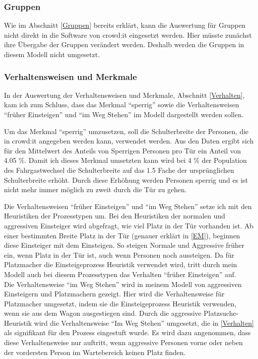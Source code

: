 \subsubsection{Gruppen}
Wie im Abschnitt \ref{Gruppen} bereits erklärt, kann die Auswertung für Gruppen nicht direkt in die Software von crowd:it eingesetzt werden. Hier müsste zunächst ihre Übergabe der Gruppen verändert werden. Deshalb werden die Gruppen in diesem Modell nicht umgesetzt.
\subsubsection{Verhaltensweisen und Merkmale}
In der Auswertung der Verhaltensweisen und Merkmale, Abschnitt \ref{Verhalten}, kam ich zum Schluss, dass das Merkmal "`sperrig"' sowie die Verhaltensweisen "`früher Einsteigen"' und "`im Weg Stehen"' im Modell dargestellt werden sollen. 

Um das Merkmal "`sperrig"' umzusetzen, soll die Schulterbreite der Personen, die in crowd:it angegeben werden kann, verwendet werden. Aus den Daten ergibt sich für den Mittelwert des Anteils von Sperrigen Personen pro Tür ein Anteil von 4.05 \%. Damit ich dieses Merkmal umsetzten kann wird bei 4 \% der Population des Fahrgastwechsel die Schulterbreite auf das 1.5 Fache der ursprünglichen Schulterbreite erhöht. Durch diese Erhöhung werden Personen sperrig und es ist nicht mehr immer möglich zu zweit durch die Tür zu gehen.

Die Verhaltensweisen "`früher Einsteigen"' und "`im Weg Stehen"' setze ich mit den Heuristiken der Prozesstypen um. Bei den Heuristiken der normalen und aggressiven Einsteiger wird abgefragt, wie viel Platz in der Tür vorhanden ist. Ab einer bestimmten Breite Platz in der Tür (genauer erklärt in \ref{EM}), beginnen diese Einsteiger mit dem Einsteigen. So steigen Normale und Aggressive früher ein, wenn Platz in der Tür ist, auch wenn Personen noch aussteigen. Da für Platzmacher die Einsteigeprozess Heuristik verwendet wird, tritt durch mein Modell auch bei diesem Prozesstypen das Verhalten "`früher Einsteigen"' auf.\\
Die Verhaltensweise "`im Weg Stehen"' wird in meinem Modell von aggressiven Einsteigern und Platzmachern gezeigt. Hier wird die Verhaltensweise für Platzmacher umgesetzt, indem sie die Einsteigeprozess Heuristik verwenden, wenn sie aus dem Wagon ausgestiegen sind. Durch die aggressive Platzsuche-Heuristik wird die Verhaltensweise "`Im Weg Stehen"' umgesetzt, die in \ref{Verhalten} als signifikant für den Prozess eingestuft wurde. Es wird dazu angenommen, dass diese Verhaltensweise nur auftritt, wenn aggressive Personen vorne oder neben der vordersten Person im Wartebereich keinen Platz finden.

